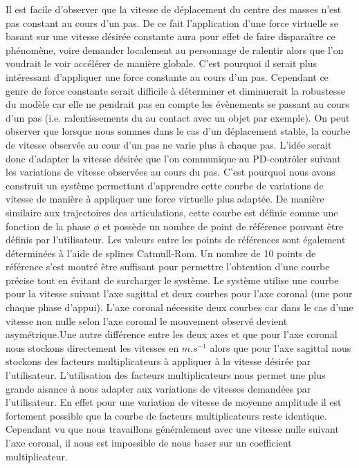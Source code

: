 \documentclass[runningheads,a4paper]{llncs}
\begin{document}
Il est facile d'observer que la vitesse de déplacement du centre des masses n'est pas constant au cours d'un pas. De ce fait l'application d'une force virtuelle se basant sur une vitesse désirée constante aura pour effet de faire disparaître ce phénomène, voire demander localement au personnage de ralentir alors que l'on voudrait le voir accélérer de manière globale. C'est pourquoi il serait plus intéressant d'appliquer une force constante au cours d'un pas. Cependant ce genre de force constante serait difficile à déterminer et diminuerait la robustesse du modèle car elle ne pendrait pas en compte les évènements se passant au cours d'un pas (i.e. ralentissements du au contact avec un objet par exemple). On peut observer que lorsque nous sommes dans le cas d'un déplacement stable, la courbe de vitesse observée au cour d'un pas ne varie plus à chaque pas. L'idée serait donc d'adapter la vitesse désirée que l'on communique au PD-contrôler suivant les variations de vitesse observées au cours du pas. C'est pourquoi nous avons construit un système permettant d'apprendre cette courbe de variations de vitesse de manière à appliquer une force virtuelle plus adaptée. De manière similaire aux trajectoires des articulations, cette courbe est définie comme une fonction de la phase \(\phi\) et possède un nombre de point de référence pouvant être définis par l'utilisateur. Les valeurs entre les points de références sont également déterminées à l'aide de splines Catmull-Rom. Un nombre de 10 points de référence s'est montré être suffisant pour permettre l'obtention d'une courbe précise tout en évitant de surcharger le système. Le système utilise une courbe pour la vitesse suivant l'axe sagittal et deux courbes pour l'axe coronal (une pour chaque phase d'appui). L'axe coronal nécessite deux courbes car dans le cas d'une vitesse non nulle selon l'axe coronal le mouvement observé devient asymétrique.Une autre différence entre les deux axes et que pour l'axe coronal nous stockons directement les vitesses en $m.s^{-1}$ alors que pour l'axe sagittal nous stockons des facteurs multiplicateurs à appliquer à la vitesse désirée par l'utilisateur. L'utilisation des facteurs multiplicateurs nous permet une plus grande aisance à nous adapter aux variations de vitesses demandées par l'utilisateur. En effet pour une variation de vitesse de moyenne amplitude il est fortement possible que la courbe de facteurs multiplicateurs reste identique. Cependant vu que nous travaillons généralement avec une vitesse nulle suivant l'axe coronal, il nous est impossible de nous baser sur un coefficient multiplicateur.
\end{document}
